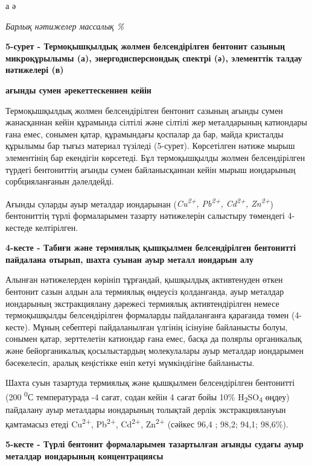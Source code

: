 а ә


\emph{Барлық нәтижелер массалық \%}

{\bfseries 5-сурет - Термоқышқылдық жолмен белсендірілген бентонит сазының
микроқұрылымы (а), энергодисперсиондық спектрі (ә), элементтік талдау
нәтижелері (в)}

{\bfseries ағынды сумен әрекеттескеннен кейін}

Термоқышқылдық жолмен белсендірілген бентонит сазының ағынды сумен
жанасқаннан кейін құрамында сілтілі және сілтілі жер металдарының
катиондары ғана емес, сонымен қатар, құрамындағы қоспалар да бар, майда
кристалды құрылымы бар тығыз материал түзіледі (5-сурет). Көрсетілген
нәтиже мырыш элементінің бар екендігін көрсетеді. Бұл термоқышқылды
жолмен белсендірілген түрдегі бентониттің ағынды сумен байланысқаннан
кейін мырыш иондарының сорбцияланғанын дәлелдейді.

Ағынды суларды ауыр металдар иондарынан (\emph{Cu\textsuperscript{2+},
Pb\textsuperscript{2+}, Cd\textsuperscript{2+}, Zn\textsuperscript{2+}})
бентониттің түрлі формаларымен тазарту нәтижелерін салыстыру төмендегі
4-кестеде келтірілген.

{\bfseries 4-кесте - Табиғи және термиялық қышқылмен белсендірілген
бентонитті пайдалана отырып, шахта суынан ауыр металл иондарын алу}


Алынған нәтижелерден көрініп тұрғандай, қышқылдық активтенуден өткен
бентонит сазын алдын ала термиялық өңдеусіз қолданғанда, ауыр металдар
иондарының экстракциялану дәрежесі термиялық активтендірілген немесе
термоқышқылды белсендірілген формаларды пайдаланғанға қарағанда төмен
(4-кесте). Мұның себептері пайдаланылған үлгінің ісінуіне байланысты
болуы, сонымен қатар, зерттелетін катиондар ғана емес, басқа да полярлы
органикалық және бейорганикалық қосылыстардың молекулалары ауыр металдар
иондарымен бәсекелесіп, аралық кеңістікке еніп кетуі мүмкіндігіне
байланысты.

Шахта суын тазартуда термиялық және қышқылмен белсендірілген бентонитті
(200 \textsuperscript{0}С температурада -4 сағат, содан кейін 4 сағат
бойы 10\% H\textsubscript{2}SO\textsubscript{4} өңдеу) пайдалану ауыр
металдары иондарының толықтай дерлік экстракциялануын қамтамасыз етеді
Cu\textsuperscript{2+}, Pb\textsuperscript{2+}, Cd\textsuperscript{2+},
Zn\textsuperscript{2+} (сәйкес 96,4 ; 98,2; 94,1; 98,6\%).

{\bfseries 5-кесте - Түрлі бентонит формаларымен тазартылған ағынды судағы
ауыр металдар иондарының концентрациясы}


